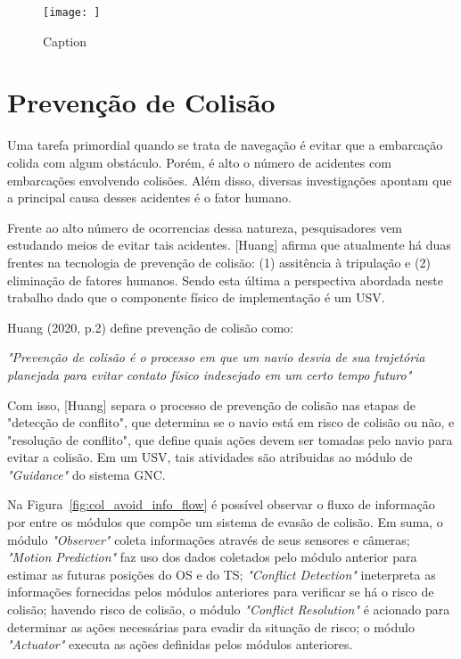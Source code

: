         \begin{figure}
            \centering
            \texttt{[image: ]}
            \caption{Caption}
            \label{fig:gnc_system}
        \end{figure}
    
    
    \section{Prevenção de Colisão}\label{subchap2:prev_col}
        Uma tarefa primordial quando se trata de navegação é evitar que a embarcação colida com algum obstáculo. Porém, é alto o número de acidentes com embarcações envolvendo colisões. Além disso, diversas investigações apontam que a principal causa desses acidentes é o fator humano.~\cite{HUANG2020451}
        
        Frente ao alto número de ocorrencias dessa natureza, pesquisadores vem estudando meios de evitar tais acidentes. [Huang] afirma que atualmente há duas frentes na tecnologia de prevenção de colisão: (1) assitência à tripulação e (2) eliminação de fatores humanos. Sendo esta última a perspectiva abordada neste trabalho dado que o componente físico de implementação é um USV.~\cite{HUANG2020451}
        
        Huang (2020, p.2) define prevenção de colisão como:
        \begin{directcite}
            \textit{"Prevenção de colisão é o processo em que um navio desvia de sua trajetória planejada para evitar contato físico indesejado em um certo tempo futuro"}
        \end{directcite}
        
        Com isso, [Huang] separa o processo de prevenção de colisão nas etapas de "detecção de conflito", que determina se o navio está em risco de colisão ou não, e "resolução de conflito", que define quais ações devem ser tomadas pelo navio para evitar a colisão. Em um USV, tais atividades são atribuidas ao módulo de \textit{"Guidance"} do sistema GNC.~\cite{HUANG2020451}
        
        Na Figura~\ref{fig:col_avoid_info_flow} é possível observar o fluxo de informação por entre os módulos que compõe um sistema de evasão de colisão. Em suma, o módulo \textit{"Observer"} coleta informações através de seus sensores e câmeras; \textit{"Motion Prediction"} faz uso dos dados coletados pelo módulo anterior para estimar as futuras posições do OS e do TS; \textit{"Conflict Detection"} ineterpreta as informações fornecidas pelos módulos anteriores para verificar se há o risco de colisão; havendo risco de colisão, o módulo \textit{"Conflict Resolution"} é acionado para determinar as ações necessárias para evadir da situação de risco; o módulo \textit{"Actuator"} executa as ações definidas pelos módulos anteriores.~\cite{HUANG2020451}
        
